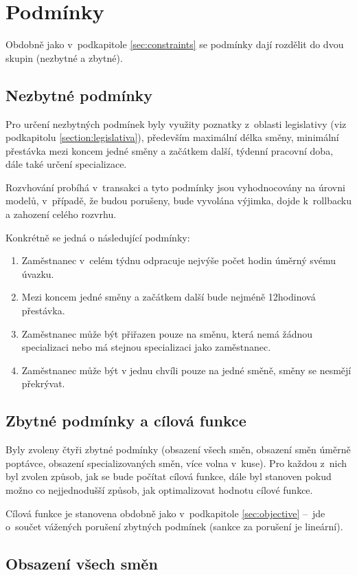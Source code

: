 \documentclass[twoside]{ctuthesis}
\begin{document}
\section{Podmínky}
Obdobně jako v~podkapitole \ref{sec:constraints} se podmínky dají rozdělit do dvou skupin (nezbytné a zbytné).

\subsection{Nezbytné podmínky}
Pro určení nezbytných podmínek byly využity poznatky z~oblasti legislativy (viz podkapitolu \ref{section:legislativa}), především maximální délka směny, minimální přestávka mezi koncem jedné směny a začátkem další, týdenní pracovní doba, dále také určení specializace.

Rozvhování probíhá v~transakci a tyto podmínky jsou vyhodnocovány na úrovni modelů, v~případě, že budou porušeny, bude vyvolána výjimka, dojde k~rollbacku a zahození celého rozvrhu.

Konkrétně se jedná o následující podmínky:

\begin{enumerate}
	\item Zaměstnanec v~celém týdnu odpracuje nejvýše počet hodin úměrný svému úvazku.
	\item Mezi koncem jedné směny a začátkem další bude nejméně 12hodinová přestávka.
	\item Zaměstnanec může být přiřazen pouze na směnu, která nemá žádnou specializaci nebo má stejnou specializaci jako zaměstnanec.
	\item Zaměstnanec může být v jednu chvíli pouze na jedné směně, směny se nesmějí překrývat.
\end{enumerate}

\subsection{Zbytné podmínky a cílová funkce}
Byly zvoleny čtyři zbytné podmínky (obsazení všech směn, obsazení směn úměrně poptávce, obsazení specializovaných směn, více volna v~kuse). Pro každou z~nich byl zvolen způsob, jak se bude počítat cílová funkce, dále byl stanoven pokud možno co nejjednodušší způsob, jak optimalizovat hodnotu cílové funkce.

Cílová funkce je stanovena obdobně jako v~podkapitole \ref{sec:objective} – jde o~součet vážených porušení zbytných podmínek (sankce za porušení je lineární).

\subsection{Obsazení všech směn}
\end{document}
